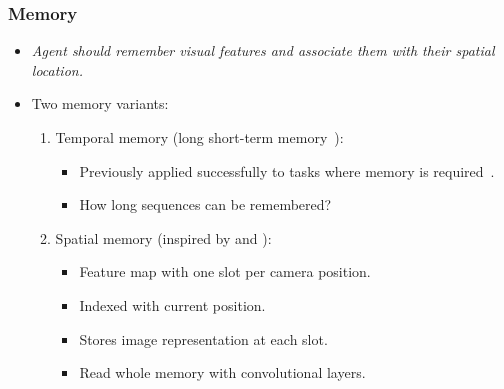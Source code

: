 \begin{frame}
    \frametitle{Memory}

    \begin{itemize}
        \item \textit{Agent should remember visual features and associate them with their spatial location.}
        \item Two memory variants:
        \begin{enumerate}
            \item Temporal memory (long short-term memory~\cite{hochreiter_long_1997}):
            \begin{itemize}
                \item Previously applied successfully to tasks where memory is required~\cite{hausknecht_deep_2017,mnih_asynchronous_2016}.
                \item How long sequences can be remembered?
            \end{itemize}
            \item Spatial memory (inspired by \cite{parisotto_neural_2017} and \cite{gupta_cognitive_2019}):
            \begin{itemize}
                \item Feature map with one slot per camera position.
                \item Indexed with current position.
                \item Stores image representation at each slot.
                \item Read whole memory with convolutional layers.
            \end{itemize}
        \end{enumerate}
    \end{itemize}
\end{frame}

